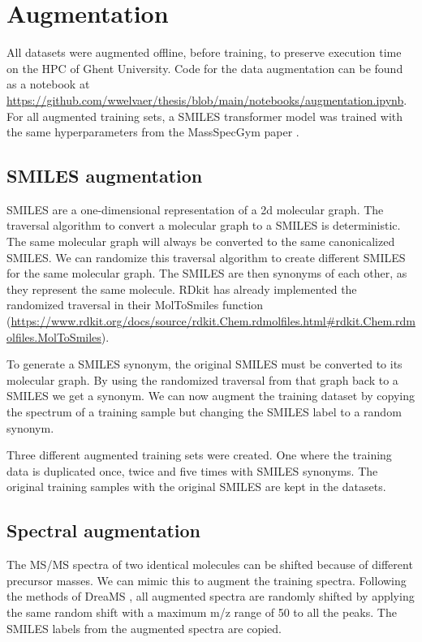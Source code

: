 \section{Augmentation}
\label{sec:augmentation}

All datasets were augmented offline, before training, to preserve execution time on the \ac{HPC} of Ghent University.
Code for the data augmentation can be found as a notebook at \url{https://github.com/wwelvaer/thesis/blob/main/notebooks/augmentation.ipynb}.
For all augmented training sets, a SMILES transformer model was trained with the same hyperparameters from the MassSpecGym paper \cite{bushuiev2024massspecgym}.

\subsection{SMILES augmentation}

SMILES are a one-dimensional representation of a 2d molecular graph.
The traversal algorithm to convert a molecular graph to a SMILES is deterministic.
The same molecular graph will always be converted to the same canonicalized SMILES.
We can randomize this traversal algorithm to create different SMILES for the same molecular graph.
The SMILES are then synonyms of each other, as they represent the same molecule.
RDkit has already implemented the randomized traversal in their MolToSmiles function (\url{https://www.rdkit.org/docs/source/rdkit.Chem.rdmolfiles.html#rdkit.Chem.rdmolfiles.MolToSmiles}).

To generate a SMILES synonym, the original SMILES must be converted to its molecular graph. 
By using the randomized traversal from that graph back to a SMILES we get a synonym.
We can now augment the training dataset by copying the spectrum of a training sample but changing the SMILES label to a random synonym.

Three different augmented training sets were created. One where the training data is duplicated once, twice and five times with SMILES synonyms.
The original training samples with the original SMILES are kept in the datasets.

\subsection{Spectral augmentation}

The \ac{MS/MS} spectra of two identical molecules can be shifted because of different precursor masses.
We can mimic this to augment the training spectra.
Following the methods of DreaMS \cite{bushuiev2024emergence}, all augmented spectra are randomly shifted by applying the same random shift with a maximum m/z range of 50 to all the peaks.
The SMILES labels from the augmented spectra are copied.

